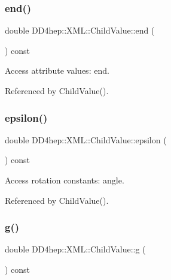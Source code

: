 \subsubsection{\texorpdfstring{end()}{end()}}
{\footnotesize\ttfamily double D\+D4hep\+::\+X\+M\+L\+::\+Child\+Value\+::end (\begin{DoxyParamCaption}{ }\end{DoxyParamCaption}) const}



Access attribute values\+: end. 



Referenced by Child\+Value().

\hypertarget{struct_d_d4hep_1_1_x_m_l_1_1_child_value_ac10f696f4e689536b14f4b4df9160a88}{}\label{struct_d_d4hep_1_1_x_m_l_1_1_child_value_ac10f696f4e689536b14f4b4df9160a88} 
\subsubsection{\texorpdfstring{epsilon()}{epsilon()}}
{\footnotesize\ttfamily double D\+D4hep\+::\+X\+M\+L\+::\+Child\+Value\+::epsilon (\begin{DoxyParamCaption}{ }\end{DoxyParamCaption}) const}



Access rotation constants\+: angle. 



Referenced by Child\+Value().

\hypertarget{struct_d_d4hep_1_1_x_m_l_1_1_child_value_a98ff4604caa12860cbb999ec6d1e1106}{}\label{struct_d_d4hep_1_1_x_m_l_1_1_child_value_a98ff4604caa12860cbb999ec6d1e1106} 
\subsubsection{\texorpdfstring{g()}{g()}}
{\footnotesize\ttfamily double D\+D4hep\+::\+X\+M\+L\+::\+Child\+Value\+::g (\begin{DoxyParamCaption}{ }\end{DoxyParamCaption}) const}



